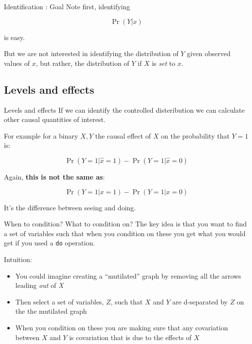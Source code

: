\documentclass[
  11pt,
  ignorenonframetext,
]{beamer}
\providecommand{\tightlist}{%
  \setlength{\itemsep}{0pt}\setlength{\parskip}{0pt}}\usepackage{longtable,booktabs,array}
\begin{document}
\begin{frame}{Identification : Goal}
\protect\hypertarget{identification-goal-1}{}
Note first, identifying

\[\Pr(Y|x)\]

is easy.

But we are not interested in identifying the distribution of \(Y\) given
observed values of \(x\), but rather, the distribution of \(Y\) if \(X\)
is \emph{set} to \(x\).
\end{frame}

\hypertarget{levels-and-effects}{%
\subsection{Levels and effects}\label{levels-and-effects}}

\begin{frame}{Levels and effects}
If we can identify the controlled disteribution we can calculate other
causal quantities of interest.

For example for a binary \(X, Y\) the causal effect of \(X\) on the
probability that \(Y=1\) is:

\[\Pr(Y=1|\hat{x}=1) - \Pr(Y=1|\hat{x}=0)\]

Again, \textbf{this is not the same as}:

\[\Pr(Y=1|x=1) - \Pr(Y=1|x=0)\]

It's the difference between seeing and doing.
\end{frame}

\begin{frame}[fragile]{When to condition? What to condition on?}
\protect\hypertarget{when-to-condition-what-to-condition-on}{}
The key idea is that you want to find a set of variables such that when
you condition on these you get what you would get if you used a
\texttt{do} operation.

Intuition:

\begin{itemize}
\tightlist
\item
  You could imagine creating a ``mutilated'' graph by removing all the
  arrows leading \emph{out} of \emph{X}
\item
  Then select a set of variables, \(Z\), such that \(X\) and \(Y\) are
  d-separated by \(Z\) on the the mutilated graph
\item
  When you condition on these you are making sure that any covariation
  between \(X\) and \(Y\) is covariation that is due to the effects of
  \(X\)
\end{itemize}
\end{frame}
\end{document}
